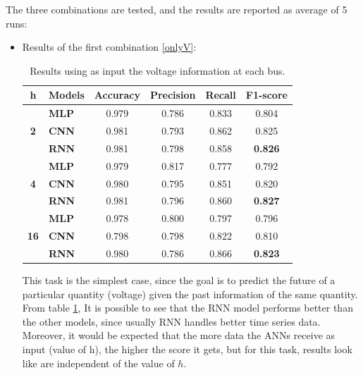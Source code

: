 The three combinations are tested, and the results are reported as average of 5 runs:
\begin{itemize}
    \item Results of the first combination \ref{onlyV}:
    
    \begin{table}[H]
    \centering
    \begin{tabular}{|c|l|c|c|c|c|}
    \hline
    \textbf{h} &
      \textbf{Models} &
      \multicolumn{1}{l|}{\textbf{Accuracy}} &
      \multicolumn{1}{l|}{\textbf{Precision}} &
      \multicolumn{1}{l|}{\textbf{Recall}} &
      \multicolumn{1}{l|}{\textbf{F1-score}} \\ \hline
    \multirow{3}{*}{\textbf{2}}  & \textbf{MLP} & 0.979 & 0.786 & 0.833 & 0.804 \\ \cline{2-6} 
                                 & \textbf{CNN} & 0.981 & 0.793 & 0.862 & 0.825 \\ \cline{2-6} 
                                 & \textbf{RNN} & 0.981 & 0.798 & 0.858 & \textbf{0.826} \\ \hline
    \multirow{3}{*}{\textbf{4}}  & \textbf{MLP} & 0.979 & 0.817 & 0.777 & 0.792 \\ \cline{2-6} 
                                 & \textbf{CNN} & 0.980 & 0.795 & 0.851 & 0.820 \\ \cline{2-6} 
                                 & \textbf{RNN} & 0.981 & 0.796 & 0.860 & \textbf{0.827} \\ \hline
    \multirow{3}{*}{\textbf{16}} & \textbf{MLP} & 0.978 & 0.800 & 0.797 & 0.796 \\ \cline{2-6} 
                                 & \textbf{CNN} & 0.798 & 0.798 & 0.822 & 0.810 \\ \cline{2-6} 
                                 & \textbf{RNN} & 0.980 & 0.786 & 0.866 & \textbf{0.823} \\ \hline
    \end{tabular}
    \caption[Models' results using voltage information]{Results using as input the voltage information at each bus.}
    \label{tab:onlyV}
    \end{table}
    This task is the simplest case, since the goal is to predict the future of a particular quantity (voltage) given the past information of the same quantity.\\
    From table \ref{tab:onlyV}, It is possible to see that the \gls{RNN} model performs better than the other models, since usually \gls{RNN} handles better time series data. Moreover, it would be expected that the more data the \glspl{ANN} receive as input (value of h), the higher the score it gets, but for this task, results look like are independent of the value of $h$.
    

\end{itemize}
